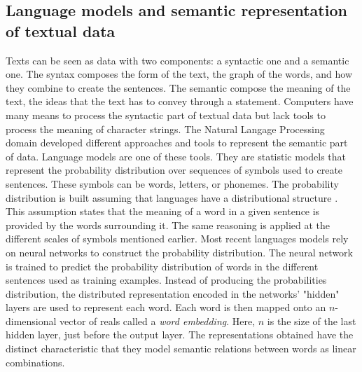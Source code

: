 \subsection{Language models and semantic representation of textual data}
Texts can be seen as data with two components: a syntactic one and a semantic one.
The syntax composes the form of the text, the graph of the words, and how they combine to create the sentences.
The semantic compose the meaning of the text, the ideas that the text has to convey through a statement.
Computers have many means to process the syntactic part of textual data but lack tools to process the meaning of character strings.
The Natural Langage Processing domain developed different approaches and tools to represent the semantic part of data.
Language models are one of these tools.
They are statistic models that represent the probability distribution over sequences of symbols used to create sentences.
These symbols can be words, letters, or phonemes.
The probability distribution is built assuming that languages have a distributional structure \parencite{harrisDistributionalStructure1954}.
This assumption states that the meaning of a word in a given sentence is provided by the words surrounding it.
The same reasoning is applied at the different scales of symbols mentioned earlier.
Most recent languages models rely on neural networks to construct the probability distribution.
The neural network is trained to predict the probability distribution of words in the different sentences used as training examples.
Instead of producing the probabilities distribution, the distributed representation encoded
in the networks' "hidden" layers are used to represent each word.
Each word is then mapped onto an \(n\)-dimensional vector of reals called a \textit{word embedding}.
Here, \(n\) is the size of the last hidden layer, just before the output layer.
The representations obtained have the distinct characteristic that they model
semantic relations between words as linear combinations.


